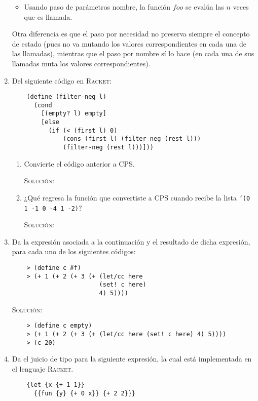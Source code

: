 \documentclass[letterpaper,11pt]{article}
\begin{document}
\begin{enumerate}
\begin{itemize}
        \item Usando paso de parámetros nombre, la función $foo$ se evalúa 
        las $n$ veces que es llamada.
    \end{itemize}

    Otra diferencia es que el paso por necesidad no preserva siempre el 
    concepto de estado (pues no va mutando los valores correspondientes en 
    cada una de las llamadas), mientras que el paso por nombre sí lo hace 
    (en cada una de sus llamadas muta los valores correspondientes).

    \item Del siguiente código en \textsc{Racket}:
    \begin{verbatim}
    (define (filter-neg l)
      (cond
        [(empty? l) empty]
        [else 
          (if (< (first l) 0)
              (cons (first l) (filter-neg (rest l)))
              (filter-neg (rest l)))]))
    \end{verbatim}

    \begin{enumerate}
        \item Convierte el código anterior a CPS.

        \textsc{Solución:}

        \item ¿Qué regresa la función que convertiste a CPS cuando recibe la 
        lista \texttt{'(0 1 -1 0 -4 1 -2)}?

        \textsc{Solución:}
    \end{enumerate}

    \item Da la expresión asociada a la continuación y el resultado de dicha 
    expresión, para cada uno de los siguientes códigos:
    \begin{verbatim}
    > (define c #f)
    > (+ 1 (+ 2 (+ 3 (+ (let/cc here 
                        (set! c here)
                        4) 5))))
    \end{verbatim}

    \textsc{Solución:}

    \begin{verbatim}
    > (define c empty)
    > (+ 1 (+ 2 (+ 3 (+ (let/cc here (set! c here) 4) 5))))
    > (c 20)
    \end{verbatim}

    \item Da el juicio de tipo para la siguiente expresión, la cual está 
    implementada en el lenguaje \textsc{Racket}.
    \begin{verbatim}
    {let {x {+ 1 1}}
      {{fun {y} {+ 0 x}} {+ 2 2}}}
    \end{verbatim}


\end{enumerate}
\end{document}
